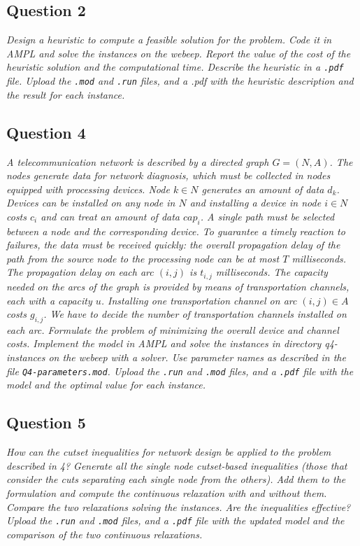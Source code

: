 \documentclass[10pt]{article}
\begin{document}
    \subsection*{Question 2}
    \textit{Design a heuristic to compute a feasible solution for the problem. Code it in AMPL and solve the instances on the webeep. Report the value of the cost of the heuristic solution and the computational time. Describe the heuristic in a \texttt{.pdf} file. Upload the \texttt{.mod} and \texttt{.run} files, and a .pdf with the heuristic description and the result for each instance.}

	

    \subsection*{Question 4}
    \textit{A telecommunication network is described by a directed graph $G=(N,A)$. The nodes generate data for network diagnosis, which must be collected in nodes equipped with processing devices. Node $k \in N$ generates an amount of data $d_k$. Devices can be installed on any node in $N$ and installing a device in node $i \in N$ costs $c_i$ and can treat an amount of data $cap_i$. A single path must be selected between a node and the corresponding device. To guarantee a timely reaction to failures, the data must be received quickly: the overall propagation delay of the path from the source node to the processing node can be at most $T$ milliseconds. The propagation delay on each arc $(i,j)$ is $t_{i,j}$ milliseconds. The capacity needed on the arcs of the graph is provided by means of transportation channels, each with a capacity $u$. Installing one transportation channel on arc $(i,j) \in A$ costs $g_{i,j}$. We have to decide the number of transportation channels installed on each arc. Formulate the problem of minimizing the overall device and channel costs. Implement the model in AMPL and solve the instances in directory q4-instances on the webeep with a solver. Use parameter names as described in the file \texttt{Q4-parameters.mod}.  Upload the \texttt{.run} and \texttt{.mod} files, and a \texttt{.pdf} file with the model and the optimal value for each instance.}


    \subsection*{Question 5}
    \textit{How can the cutset inequalities for network design be applied to the problem described in 4? Generate all the single node cutset-based inequalities (those that consider the cuts separating each single node from the others). Add them to the formulation and compute the continuous relaxation with and without them. Compare the two relaxations solving the instances. Are the inequalities effective? Upload the \texttt{.run} and \texttt{.mod} files, and a \texttt{.pdf} file with the updated model and the comparison of the two continuous relaxations.}
\end{document}
